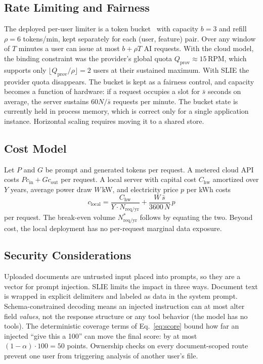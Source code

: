 \documentclass[conference]{IEEEtran}
\begin{document}
\subsection{Rate Limiting and Fairness}
The deployed per-user limiter is a token bucket~\cite{tanenbaum2011networks}
with capacity $b{=}3$ and refill $\rho{=}6$ tokens/min, kept separately for
each (user, feature) pair. Over any window of $T$ minutes a user can issue at
most $b + \rho T$ AI requests. With the cloud model, the binding constraint
was the provider's global quota $Q_{\text{prov}}{\approx}15$\,RPM, which
supports only $\lfloor Q_{\text{prov}}/\rho \rfloor = 2$ users at their
sustained maximum. With SLIE the provider quota disappears. The bucket is
kept as a fairness control, and capacity becomes a function of hardware: if
a request occupies a slot for $\bar{s}$ seconds on average, the server
sustains $60N/\bar{s}$ requests per minute. The bucket state is currently held
in process memory, which is correct only for a single application instance.
Horizontal scaling requires moving it to a shared store.

\subsection{Cost Model}
Let $P$ and $G$ be prompt and generated tokens per request. A metered cloud
API costs $P c_{\text{in}} + G c_{\text{out}}$ per request. A local server
with capital cost $C_{\text{hw}}$ amortized over $Y$ years, average power
draw $W$\,kW, and electricity price $p$ per kWh costs
\begin{equation}
c_{\text{local}} = \frac{C_{\text{hw}}}{Y \cdot N_{\text{req/yr}}} +
\frac{W\,\bar{s}}{3600\,N}\,p
\end{equation}
per request. The break-even volume
$N^{\ast}_{\text{req/yr}}$ follows by equating the two. Beyond cost, the
local deployment has no per-request marginal data exposure.

\subsection{Security Considerations}
Uploaded documents are untrusted input placed into prompts, so they are a
vector for prompt injection. SLIE limits the impact in three ways. Document
text is wrapped in explicit delimiters and labeled as data in the system
prompt. Schema-constrained decoding means an injected instruction can at most
alter field \emph{values}, not the response structure or any tool behavior
(the model has no tools). The deterministic coverage terms of
Eq.~\eqref{eq:score} bound how far an injected ``give this a 100'' can move the
final score: by at most $(1-\alpha)\cdot100 = 50$ points. Ownership checks on
every document-scoped route prevent one user from triggering analysis of
another user's file.
\end{document}
